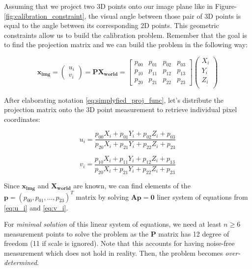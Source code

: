 \documentclass[a4paper]{report}
\numberwithin{figure}{section}
\begin{document}
Assuming that we project two 3D points onto our image plane
like in Figure-\ref{fig:calibration_constraint},
the visual angle between those pair of 3D points is equal to 
the angle between its corresponding 2D points. This geometric constraints 
allow us to build the calibration problem. Remember that the goal is to find 
the projection matrix and we can build the problem in the following way:

\begin{equation}
  \mathbf{x_{img}} = 
  \begin{pmatrix}
    u_i\\
    v_i
  \end{pmatrix}
  =
  \mathbf{P}\mathbf{X_{world}} = 
  \begin{bmatrix}
    p_{00} & p_{01} & p_{02} & p_{03}\\
    p_{10} & p_{11} & p_{12} & p_{13}\\
    p_{20} & p_{21} & p_{22} & p_{23}
  \end{bmatrix}
  \begin{pmatrix}
    X_i\\
    Y_i\\
    Z_i\\
  \end{pmatrix}
\end{equation} \label{eq:simplyfied_proj_func}

After elaborating notation \ref{eq:simplyfied_proj_func}, let's distribute 
the projection matrix onto the 3D point measurement to retrieve individual 
pixel coordinates:

\begin{equation}
  u_i = 
  \frac
  {p_{00}X_i + p_{01}Y_i + p_{02}Z_i + p_{03}}
  {p_{20}X_i + p_{21}Y_i + p_{22}Z_i + p_{23}}
\end{equation} \label{eq:u_i}

\begin{equation}
  v_i = 
  \frac
  {p_{10}X_i + p_{11}Y_i + p_{12}Z_i + p_{13}}
  {p_{20}X_i + p_{21}Y_i + p_{22}Z_i + p_{23}}
\end{equation} \label{eq:v_i}


Since $\mathbf{x_{img}}$ and $\mathbf{X_{world}}$ are known,
we can find elements of the $\mathbf{p} = (p_{00}, p_{01}, \dots, p_{23})^T$ matrix 
by solving $\mathbf{Ap=0}$ liner system of equations from \ref{eq:u_i} and \ref{eq:v_i}.

For \textit{minimal solution} of this linear system of equations, 
we need at least $n \geq 6$ measurement points to solve the problem as 
the $\mathbf{P}$ matrix has 12 degree of freedom (11 if scale is ignored).
Note that this accounts for having 
noise-free measurement which does not hold in reality. Then, the problem 
becomes \textit{over-determined}.
\end{document}
